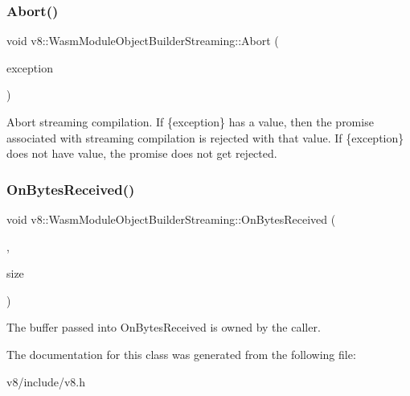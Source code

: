 \subsubsection{\texorpdfstring{Abort()}{Abort()}}
{\footnotesize\ttfamily void v8\+::\+Wasm\+Module\+Object\+Builder\+Streaming\+::\+Abort (\begin{DoxyParamCaption}\item[{\mbox{\hyperlink{classv8_1_1MaybeLocal}{Maybe\+Local}}$<$ \mbox{\hyperlink{classv8_1_1Value}{Value}} $>$}]{exception }\end{DoxyParamCaption})}

Abort streaming compilation. If \{exception\} has a value, then the promise associated with streaming compilation is rejected with that value. If \{exception\} does not have value, the promise does not get rejected. \mbox{\label{classv8_1_1WasmModuleObjectBuilderStreaming_ac67b675b7241a18a3b773dab2f0fd458}} 
\subsubsection{\texorpdfstring{On\+Bytes\+Received()}{OnBytesReceived()}}
{\footnotesize\ttfamily void v8\+::\+Wasm\+Module\+Object\+Builder\+Streaming\+::\+On\+Bytes\+Received (\begin{DoxyParamCaption}\item[{const uint8\+\_\+t $\ast$}]{,  }\item[{size\+\_\+t}]{size }\end{DoxyParamCaption})}

The buffer passed into On\+Bytes\+Received is owned by the caller. 

The documentation for this class was generated from the following file\+:\begin{DoxyCompactItemize}
\item 
v8/include/v8.\+h\end{DoxyCompactItemize}
